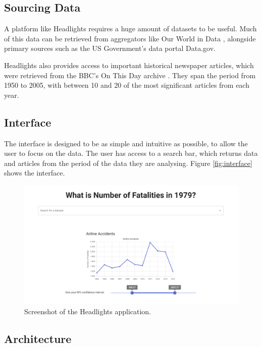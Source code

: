 \documentclass{article}
\begin{document}
\subsection{Sourcing Data}

A platform like Headlights requires a huge amount of datasets to be useful. Much of this data can be retrieved from aggregators like Our World in Data \cite{ourworldindata}, alongside primary sources such as the US Government's data portal Data.gov.

Headlights also provides access to important historical newspaper articles, which were retrieved from the BBC's On This Day archive \cite{onthisday}. They span the period from 1950 to 2005, with between 10 and 20 of the most significant articles from each year.

\subsection{Interface}

The interface is designed to be as simple and intuitive as possible, to allow the user to focus on the data. The user has access to a search bar, which returns data and articles from the period of the data they are analysing. Figure \ref{fig:interface} shows the interface.

\begin{figure}[h]
  \centering
  \includegraphics[width=\textwidth]{screenshot.png}
  \caption{Screenshot of the Headlights application.}
  \label{fig:screenshot}
\end{figure}

\newpage

\subsection{Architecture}
\end{document}
